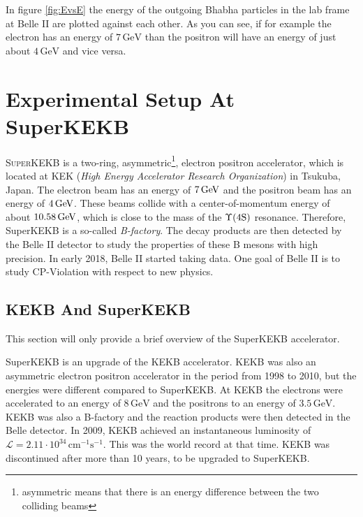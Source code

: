 \documentclass[a4paper,11pt,twosided,final,german,openbib,pdftex,listof=totoc,bibliography=totoc]{scrbook}
\begin{document}
In figure \ref{fig:EvsE} the energy of the outgoing Bhabha particles in the lab frame at Belle II are plotted against each other. As you can see, if for example the electron has an energy of $7\,\textrm{GeV}$ than the positron will have an energy of just about $4\,\textrm{GeV}$ and vice versa.










\chapter{Experimental Setup At SuperKEKB}
\label{sec:SetupKEK}

\lettrine{S}{uperKEKB} is a two-ring, asymmetric\footnote{asymmetric means that there is an energy difference between the two colliding beams}, electron positron accelerator, which is located at KEK (\textit{High Energy Accelerator Research Organization}) in Tsukuba, Japan. 
The electron beam has an energy of $7\,\textnormal{GeV}$ and the positron beam has an energy of $4\,\textnormal{GeV}$. These beams collide with a center-of-momentum energy of about $10.58\,\textnormal{GeV}$, which is close to the mass of the $\Upsilon(4\textnormal{S})$ resonance. Therefore, SuperKEKB is a so-called \textit{B-factory}. The decay products are then detected by the Belle II detector to study the properties of these B mesons with high precision. In early 2018, Belle II started taking data. One goal of Belle II is to study CP-Violation with respect to new physics.\cite{B2B}

\section{KEKB And SuperKEKB}
\label{sec:KEK}
This section will only provide a brief overview of the SuperKEKB accelerator.

SuperKEKB is an upgrade of the KEKB accelerator. KEKB was also an asymmetric electron positron accelerator in the period from 1998 to 2010, but the energies were different compared to SuperKEKB. At KEKB the electrons were accelerated to an energy of $8\,\textrm{GeV}$ and the positrons to an energy of $3.5\,\textrm{GeV}$. KEKB was also a B-factory and the reaction products were then detected in the Belle detector. In 2009, KEKB achieved an instantaneous luminosity of $\mathcal{L} = 2.11 \cdot 10^{34}\,\textrm{cm}^{-1}\textrm{s}^{-1}$. This was the world record at that time. KEKB was discontinued after more than 10 years, to be upgraded to SuperKEKB.\cite{PTEP}
\end{document}
